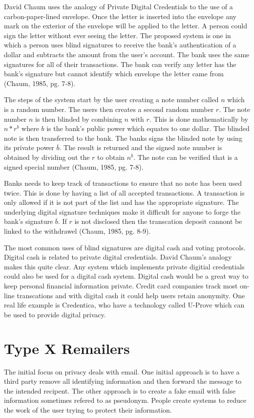 \documentclass[12pt]{article}
\begin{document}
David Chaum uses the analogy of Private Digital Credentials to the use of a carbon-paper-lined envelope. Once the letter is inserted into the envelope any mark on the exterior of the envelope will be applied to the letter. A person could sign the letter without ever seeing the letter. The proposed system is one in which a person uses blind signatures to receive the bank's authentication of a dollar and subtracts the amount from the user's account. The bank uses the same signatures for all of their transactions. The bank can verify any letter has the bank's signature but cannot identify which envelope the letter came from (Chaum, 1985, pg. 7-8).

The steps of the system start by the user creating a note number called $n$ which is a random number. The users then creates a second random number $r$. The note number $n$ is then blinded by combining $n$ with $r$. This is done mathematically by $n * r^b$ where $b$ is the bank's public power which equates to one dollar. The blinded note is then transferred to the bank. The banks signs the blinded note by using its private power $\overline{b}$. The result is returned and the signed note number is obtained by dividing out the $r$ to obtain $n^{\overline{b}}$. The note can be verified that is a signed special number (Chaum, 1985, pg. 7-8).

Banks needs to keep track of transactions to ensure that no note has been used twice. This is done by having a list of all accepted transactions. A transaction is only allowed if it is not part of the list and has the appropriate signature. The underlying digital signature techniques make it difficult for anyone to forge the bank's signature $\overline{b}$. If $r$ is not disclosed then the transcation deposit cannont be linked to the withdrawel (Chaum, 1985, pg. 8-9).

The most common uses of blind signatures are digital cash and voting protocols. Digital cash is related to private digital credentials. David Chaum's analogy makes this quite clear. Any system which implements private digitial credentials could also be used for a digital cash system. Digital cash would be a great way to keep personal financial information private. Credit card companies track most on-line transcations and with digital cash it could help users retain anonymity. One real life example is Credentica, who have a technology called U-Prove which can be used to provide digital privacy.

\section{Type X Remailers}\label{sec:type-x}
The initial focus on privacy deals with email. One initial approach is to have a third party remove all identifying information and then forward the message to the intended recipent. The other approach is to create a fake email with false information sometimes refered to as pseudonym. People create systems to reduce the work of the user trying to protect their information.
\end{document}
